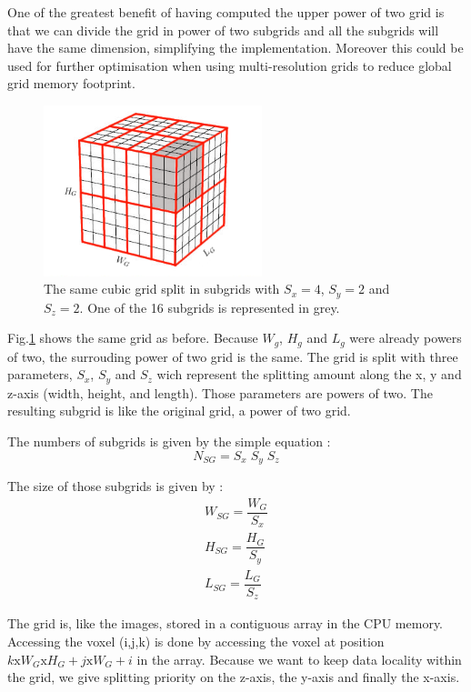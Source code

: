 \documentclass[12pt,journal,compsoc]{IEEEtran}
\begin{document}
One of the greatest benefit of having computed the upper power of two grid is that we can divide the grid in power of two subgrids and all the subgrids will have the same dimension, simplifying the implementation. Moreover this could be used for further optimisation when using multi-resolution grids to reduce global grid memory footprint. 

\begin{figure}[!ht]
\centering
\includegraphics[width=2.5in]{subgrid}
\caption{The same cubic grid split in subgrids with $S_x = 4$, $S_y=2$ and $S_z=2$. One of the 16 subgrids is represented in grey.}
\label{subgrids}
\end{figure}

Fig.\ref{subgrids} shows the same grid as before. Because $W_g$, $H_g$ and $L_g$ were already powers of two, the surrouding power of two grid is the same. The grid is split with three parameters, $S_x$, $S_y$ and $S_z$ wich represent the splitting amount along the x, y and z-axis (width, height, and length). Those parameters are powers of two. The resulting subgrid is like the original grid, a power of two grid. 
\begin{samepage}
The numbers of subgrids is given by the simple equation :
\begin{equation}
	N_{SG} = S_x\;S_y\;S_z
\end{equation}
\end{samepage}

\begin{samepage}
The size of those subgrids is given by :
\begin{eqnarray}
	W_{SG} = \dfrac{W_G}{S_x}\\
	H_{SG} = \dfrac{H_G}{S_y}\\
	L_{SG} = \dfrac{L_G}{S_z}
\end{eqnarray}
\end{samepage}

The grid is, like the images, stored in a contiguous array in the CPU memory. Accessing the voxel (i,j,k) is done by accessing the voxel at position $k\text{x}W_G\text{x}H_G + j\text{x}W_G + i$ in the array.
Because we want to keep data locality within the grid, we give splitting priority on the z-axis, the y-axis and finally the x-axis.
\end{document}

